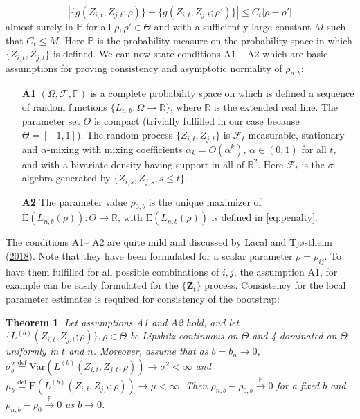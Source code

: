 \documentclass[
  12pt,
  letterpaper]{article}
\newtheorem{thm}{Theorem}[section]
\numberwithin{equation}{section}
\newcommand{\Z}{\bm{Z}}
\newcommand{\E}{\textrm{E}}
\newcommand{\Var}{\textrm{Var}}
\begin{document}
\[|\{g(Z_{i,t}, Z_{j,t}; \rho)\} - \{g(Z_{i,t}, Z_{j,t}; \rho')\}| \leq C_t|\rho - \rho'|\]
almost surely in \(\mathbb{P}\) for all \(\rho,\rho'\in\Theta\) and with a sufficiently large constant \(M\) such that \(C_t\leq M\). Here \(\mathbb{P}\) is the probability measure on the probability space in which \(\{Z_{i,t}, Z_{j,t}\}\) is defined. We can now state conditions A1 -- A2 which are basic assumptions for proving consistency and asymptotic normality of \(\rho_{n,b}\):

\begin{itemize}
\item[\textbf{A1}] $(\Omega, \mathcal{F}, \mathbb{P})$ is a complete probability space on which is defined a sequence of random functions $\{L_{n,b}: \Omega\rightarrow\overline{\mathbb{R}}\}$, where $\overline{\mathbb{R}}$ is the extended real line. The parameter set $\Theta$ is compact (trivially fulfilled in our case because $\Theta = [-1,1]$). The random process $\{Z_{i,t}, Z_{j,t}\}$ is $\mathcal{F}_t$-measurable, stationary and $\alpha$-mixing with mixing coefficients $\alpha_k = O(\alpha^k)$, $\alpha \in (0,1)$ for all $t$, and with a bivariate density having support in all of $\mathbb{R}^2$. Here $\mathcal{F}_t$ is the $\sigma$-algebra generated by $\{Z_{i,s}, Z_{j,s}, s \leq t\}$.
\item[\textbf{A2}] The parameter value $\rho_{0,b}$ is the unique maximizer of $\E(L_{n,b}(\rho)): \Theta \rightarrow \overline{\mathbb{R}}$, with $\E(L_{n,b}(\rho))$ is defined in \eqref{eq:penalty}.
\end{itemize}

The conditions A1-- A2 are quite mild and discussed by Lacal and Tjøstheim (\protect\hyperlink{ref-lacal2018estimating}{2018}). Note that they have been formulated for a scalar parameter \(\rho = \rho_{ij}\). To have them fulfilled for all possible combinations of \(i,j\), the assumption A1, for example can be easily formulated for the \(\{\Z_t\}\) process. Consistency for the local parameter estimates is required for consistency of the bootstrap:

\begin{thm} Let assumptions A1 and A2 hold, and let $\{L^{(b)}(Z_{i,t}, Z_{j,t};\rho)\}, \rho \in \Theta$ be Lipshitz continuous on $\Theta$ and 4-dominated on $\Theta$ uniformly in $t$ and $n$. Moreover, assume that as $b=b_n\rightarrow 0$, $\sigma^2_b \stackrel{\textrm{def}}{=} \Var\left(L^{(b)}(Z_{i,t}, Z_{j,t};\rho)\right) \rightarrow \sigma^2 < \infty$ and $\mu_b \stackrel{\textrm{def}}{=} \E\left(L^{(b)}(Z_{i,t}, Z_{j,t};\rho)\right) \rightarrow \mu < \infty$. Then $\rho_{n,b} - \rho_{0,b} \stackrel{\mathbb{P}}{\rightarrow} 0$ for a fixed $b$ and $\rho_{n,b} - \rho_{0} \stackrel{\mathbb{P}}{\rightarrow} 0$ as $b \rightarrow 0$.
\label{thm:A1}
\end{thm}
\end{document}
